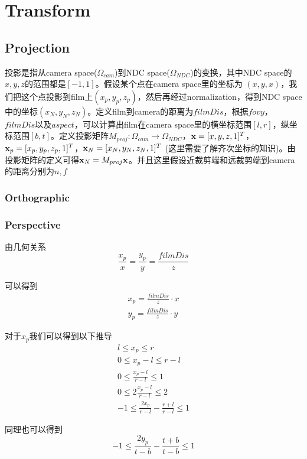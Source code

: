\section{Transform}
\subsection{Projection}
投影是指从camera space($\Omega_{cam}$)到NDC space($\Omega_{NDC}$)的变换，其中NDC space的$x,y,z$的范围都是$[-1,1]$。假设某个点在camera space里的坐标为 $(x,y,x)$，我们把这个点投影到film上$(x_p,y_p,z_p)$，然后再经过normalization，得到NDC space中的坐标$(x_N, y_N,z_N)$。定义film到camera的距离为$filmDis$，根据$fovy$，$filmDis$以及$aspect$，可以计算出film在camera space里的横坐标范围$[l,r]$，纵坐标范围$[b,t]$。定义投影矩阵$M_{proj}: \Omega_{cam}\to \Omega_{NDC}$，$\bold{x} = [x, y, z, 1]^T$，$\bold{x}_p = [x_p, y_p, z_p, 1]^T$，$\bold{x}_N = [x_N, y_N, z_N, 1]^T$ (这里需要了解齐次坐标的知识)。由投影矩阵的定义可得$\bold{x}_N = M_{proj}\bold{x}$。并且这里假设近裁剪端和远裁剪端到camera的距离分别为$n,f$
\subsubsection{Orthographic}
\subsubsection{Perspective}
由几何关系
\begin{displaymath}
\frac{x_p}{x} = \frac{y_p}{y} = \frac{filmDis}{z}
\end{displaymath}

可以得到
\begin{gather*}
x_p = \frac{filmDis}{z} \cdot x\\
y_p = \frac{filmDis}{z} \cdot y
\end{gather*}

对于$x_p$我们可以得到以下推导
\begin{gather*}
l \leq x_p \leq r\\
0 \leq x_p - l \leq r-l\\
0 \leq \frac{x_p - l}{r - l} \leq 1\\
0 \leq 2\frac{x_p - l}{r - l} \leq 2\\
-1 \leq \frac{2 x_p}{r-l} - \frac{r + l}{r - l} \leq 1
\end{gather*}

同理也可以得到
\begin{displaymath}
-1 \leq \frac{2y_p}{t - b} - \frac{t + b}{t - b} \leq 1
\end{displaymath}
\\

